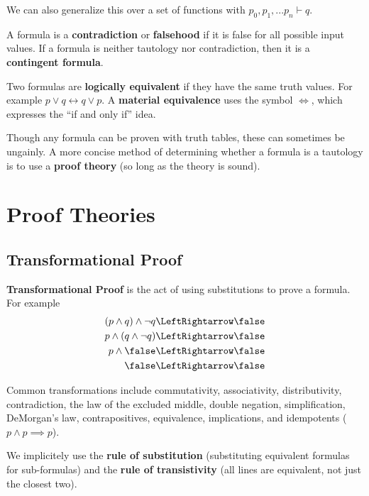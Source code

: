 \documentclass[12pt]{article}
\begin{document}
We can also generalize this over a set of functions with $p_0, p_1, ... p_n \vdash q$.

A formula is a {\bf contradiction} or {\bf falsehood} if it is false for all possible input values. If a formula is neither tautology nor contradiction, then it is a {\bf contingent formula}.

Two formulas are {\bf logically equivalent} if they have the same truth values. For example $p \lor q \leftrightarrow q \lor p$. A {\bf material equivalence} uses the symbol $\Leftrightarrow$, which expresses the ``if and only if'' idea.

Though any formula can be proven with truth tables, these can sometimes be ungainly. A more concise method of determining whether a formula is a tautology is to use a {\bf proof theory} (so long as the theory is sound).

\section*{Proof Theories}
\subsection*{Transformational Proof}
{\bf Transformational Proof} is the act of using substitutions to prove a formula. For example
\begin{align*}
(p \land q) \land \neg q &\LeftRightarrow \false\\
p \land (q \land \neg q) &\LeftRightarrow \false\\
p \land \false &\LeftRightarrow \false\\
\false &\LeftRightarrow \false
\end{align*}

Common transformations include commutativity, associativity, distributivity, contradiction, the law of the excluded middle, double negation, simplification, DeMorgan's law, contrapositives, equivalence, implications, and idempotents ($p \land p \implies p$).

We implicitely use the {\bf rule of substitution} (substituting equivalent formulas for sub-formulas) and the {\bf rule of transistivity} (all lines are equivalent, not just the closest two).
\end{document}
